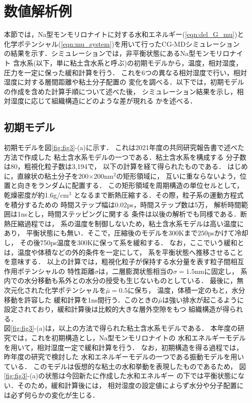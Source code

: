 \section{数値解析例}
本節では，Na型モンモリロナイトに対する水和エネルギー(\ref{eqn:del_G_mu})と
化学ポテンシャル(\ref{eqn:mu_system})を用いて行ったCG-MDシミュレーション
の結果を示す．シミュレーションでは，非平衡状態にあるNa型モンモリロナイト
含水系(以下，単に粘土含水系と呼ぶ)の初期モデルから，温度，相対湿度，
圧力を一定に保った緩和計算を行う．
これを6つの異なる相対湿度で行い，相対湿度に対する層間距離や粘土分子配置の
変化を調べる．以下では，初期モデルの作成を含めた計算手順について述べた後，
シミュレーション結果を示し，相対湿度に応じて組織構造にどのような差が現れる
かを述べる．
\subsection{初期モデル}
初期モデルを図\ref{fig:fig3}-(a)に示す．
これは2021年度の共同研究報告書で述べた方法で作成した
粘土含水系モデルの一つである．粘土含水系を構成する
分子数は80，粗視化粒子数は3,194で，
以下の計算を経て得られたものである．
はじめに，直線状の粘土分子を200$\times$200nm$^2$の矩形領域に，
互いに重ならないよう，位置と向きをランダムに配置する．
この矩形領域を周期構造の単位セルとして，乾燥密度が約1.6g/cm$^{3}$
となるまで断熱圧縮する．その際，粒子系の運動方程式を積分するための
時間ステップ幅は0.02ps，時間ステップ数は5万，
解析時間範囲は1nsとし，時間ステッピングに関する
条件は以後の解析でも同様である．断熱圧縮過程では，
系の温度を制御しないため，粘土含水系モデルは高い温度にあり，
平衡状態にも無い．そこで，圧縮後のモデルを300Kまで$250$psかけて冷却し，
その後750ps温度を300Kに保って系を緩和する．
なお，ここでいう緩和とは，温度や体積などの外的条件を一定にして，
系を平衡状態へ推移させることを意味する．
以上の計算では，粗視化粒子が保持する水分量を表す粒子間相互作用ポテンシャルの
特性距離$\sigma$は，二層膨潤状態相当の$\sigma=1.5$nmに固定し，
系内での水分移動も系外との水分の授受も生じないものとしている．
最後に，無次元化された化学ポテンシャルを$\bar \mu =0.5$に保ち，
温度，体積一定のもと，水分移動を許容した
緩和計算を1ns間行う．このときの$\bar \mu$は強い排水が起こるように
設定されており，緩和計算後は比較的大きな層外空隙をもつ
組織構造が得られる．\\
\hspace{\parindent}
図\ref{fig:fig3}-(a)は，以上の方法で得られた粘土含水系モデルである．
本年度の研究では，これを初期構造とし，Na型モンモリロナイトの
水和エネルギーモデルを用いて，相対湿度一定で緩和計算を行う．
なお，初期構造を得る過程では，昨年度の研究で検討した
水和エネルギーモデルの一つである振動モデルを用いている．
このモデルは仮想的な粘土の水和挙動を表現したものであるため，
図\ref{fig:fig3}-(a)の状態は今回新たに作成した水和エネルギー
の下では平衡状態にない．そのため，緩和計算後には，
相対湿度の設定値によらず水分や分子配置には必ず何らかの変化が生じる．
